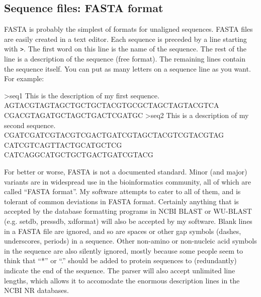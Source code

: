 \subsection{Sequence files: FASTA format}

FASTA is probably the simplest of formats for unaligned sequences.
FASTA files are easily created in a text editor.  Each sequence is
preceded by a line starting with \verb+>+. The first word on this line
is the name of the sequence. The rest of the line is a description of
the sequence (free format). The remaining lines contain the sequence
itself. You can put as many letters on a sequence line as you want.
For example:

\begin{sreoutput}
>seq1 This is the description of my first sequence.
AGTACGTAGTAGCTGCTGCTACGTGCGCTAGCTAGTACGTCA CGACGTAGATGCTAGCTGACTCGATGC
>seq2 This is a description of my second sequence.
CGATCGATCGTACGTCGACTGATCGTAGCTACGTCGTACGTAG CATCGTCAGTTACTGCATGCTCG
CATCAGGCATGCTGCTGACTGATCGTACG
\end{sreoutput}

For better or worse, FASTA is not a documented standard. Minor (and
major) variants are in widespread use in the bioinformatics community,
all of which are called ``FASTA format''. My software attempts to
cater to all of them, and is tolerant of common deviations in FASTA
format. Certainly anything that is accepted by the database formatting
programs in NCBI BLAST or WU-BLAST (e.g. setdb, pressdb, xdformat)
will also be accepted by my software. Blank lines in a FASTA file are
ignored, and so are spaces or other gap symbols (dashes, underscores,
periods) in a sequence. Other non-amino or non-nucleic acid symbols in
the sequence are also silently ignored, mostly because some people
seem to think that ``*'' or ``.'' should be added to protein sequences
to (redundantly) indicate the end of the sequence. The parser will
also accept unlimited line lengths, which allows it to accomodate the
enormous description lines in the NCBI NR databases.

